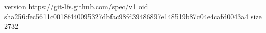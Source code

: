 version https://git-lfs.github.com/spec/v1
oid sha256:fec5611c0018f440095327dbfac98fd39486897e148519b87c04e4cafd0043a4
size 2732
